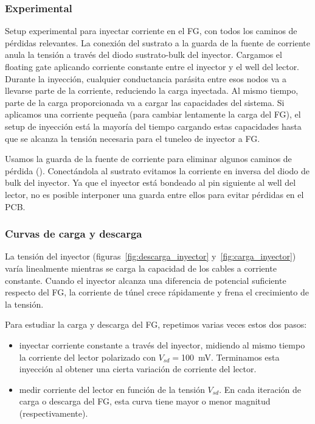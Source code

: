 \subsubsection{Experimental}
{Setup experimental para inyectar corriente en el FG,
con todos los caminos de pérdidas relevantes.
La conexión del sustrato a la guarda de la fuente de corriente
anula la tensión a través del diodo sustrato-bulk del inyector.}
Cargamos el floating gate aplicando corriente constante
entre el inyector y el well del lector.
Durante la inyección,
cualquier conductancia parásita entre esos nodos 
va a llevarse parte de la corriente,
reduciendo la carga inyectada.
Al mismo tiempo, parte de la carga proporcionada
va a cargar las capacidades del sistema.
Si aplicamos una corriente pequeña
(para cambiar lentamente la carga del FG),
el setup de inyección está la mayoría del tiempo cargando estas capacidades
hasta que se alcanza la tensión necesaria para el tuneleo de inyector a FG.

Usamos la guarda de la fuente de corriente para eliminar algunos caminos de pérdida
().
Conectándola al sustrato evitamos la corriente en inversa del diodo de bulk
del inyector.
Ya que el inyector está bondeado al pin siguiente al well del lector,
no es posible interponer una guarda entre ellos para evitar pérdidas en el PCB.
\subsubsection{Curvas de carga y descarga}
La tensión del inyector (figuras~\ref{fig:descarga_inyector}
y~\ref{fig:carga_inyector})
varía linealmente mientras se carga la capacidad de los cables a corriente
constante.
Cuando el inyector alcanza una diferencia de potencial suficiente respecto del FG,
la corriente de túnel crece rápidamente y frena el crecimiento de la tensión.

Para estudiar la carga y descarga del FG,
repetimos varias veces estos dos pasos:
\begin{itemize}
    \item inyectar corriente constante a través del inyector,
        midiendo al mismo tiempo la corriente del lector 
        polarizado con $V_{sd}=$\SI{100}{\milli\volt}.
        Terminamos esta inyección al obtener una cierta variación de corriente
        del lector.
    \item medir corriente del lector en función de la tensión $V_{sd}$.
        En cada iteración de carga o descarga del FG,
        esta curva tiene mayor o menor magnitud (respectivamente).
\end{itemize}

